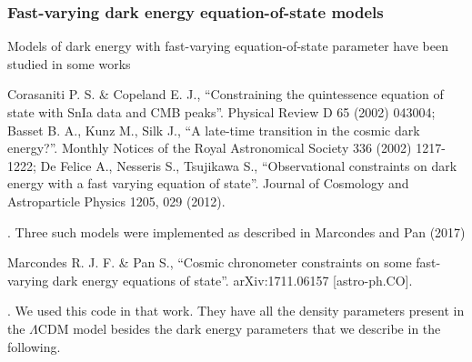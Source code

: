 \documentclass[letterpaper,12pt,english]{sphinxhowto}
\begin{document}
\subsubsection{Fast-varying dark energy equation-of-state models}
\label{\detokenize{themodels:fast-varying-dark-energy-equation-of-state-models}}
Models of dark energy with fast-varying equation-of-state parameter have been
studied in some works %
\begin{footnote}[6]\sphinxAtStartFootnote
Corasaniti P. S. \& Copeland E. J., “Constraining the quintessence equation of state with SnIa data and CMB peaks”. Physical Review D 65 (2002) 043004; Basset B. A., Kunz M., Silk J., “A late-time transition in the cosmic dark energy?”. Monthly Notices of the Royal Astronomical Society 336 (2002) 1217-1222; De Felice A., Nesseris S., Tsujikawa S., “Observational constraints on dark energy with a fast varying equation of state”. Journal of Cosmology and Astroparticle Physics 1205, 029 (2012).
%
\end{footnote}. Three such models were implemented as
described in Marcondes and Pan (2017) %
\begin{footnote}[7]\sphinxAtStartFootnote
Marcondes R. J. F. \& Pan S., “Cosmic chronometer constraints on some fast-varying dark energy equations of state”. arXiv:1711.06157 {[}astro-ph.CO{]}.
%
\end{footnote}. We used this code
in that work.
They have all the density parameters present in the \(\Lambda\text{CDM}\)
model besides the dark energy parameters that we describe in the following.
\end{document}
